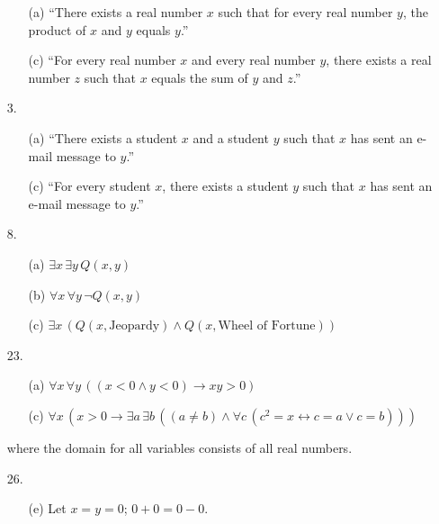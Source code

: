 \documentclass{article}
\begin{document}
\begin{enumerate}
\begin{itemize}
            \item[(a)] ``There exists a real number $x$ such that for every real number $y$, the product of $x$ and $y$ equals $y$.''
            \item[(c)] ``For every real number $x$ and every real number $y$, there exists a real number $z$ such that $x$ equals the sum of $y$ and $z$.''
        \end{itemize}
    \item[3.]
        \begin{itemize}
            \item[(a)] ``There exists a student $x$ and a student $y$ such that $x$ has sent an e-mail message to $y$.''
            \item[(c)] ``For every student $x$, there exists a student $y$ such that $x$ has sent an e-mail message to $y$.''
        \end{itemize}
    \item[8.]
        \begin{itemize}
            \item[(a)] $\exists x \, \exists y \, Q(x,y)$
            \item[(b)] $\forall x \, \forall y \, \neg Q(x,y)$
            \item[(c)] $\exists x \, \left( Q(x, \textrm{Jeopardy}) \land Q(x, \textrm{Wheel of Fortune}) \right)$
        \end{itemize}
    \item[23.]
        \begin{itemize}
            \item[(a)] $\forall x \, \forall y \, \left( \left( x<0 \land y<0 \right) \rightarrow xy>0 \right)$
            \item[(c)] $\forall x \, \left( x > 0 \rightarrow \exists a \, \exists b \, \left( (a \neq b) \land \forall c \, \left( c^2 = x \leftrightarrow c = a \lor c = b \right) \right) \right)$
        \end{itemize}
        where the domain for all variables consists of all real numbers.
    \item[26.]
        \begin{itemize}
            \item[(e)]  Let $x = y = 0$; $0 + 0 = 0 - 0$.

\end{itemize}
\end{enumerate}
\end{document}
